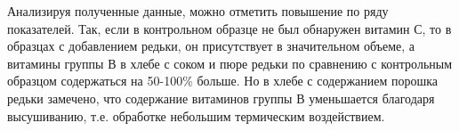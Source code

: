 
Анализируя полученные данные, можно отметить повышение по ряду
показателей. Так, если в контрольном образце не был обнаружен витамин С,
то в образцах с добавлением редьки, он присутствует в значительном
объеме, а витамины группы В в хлебе с соком и пюре редьки по сравнению с
контрольным образцом содержаться на 50-100\% больше. Но в хлебе с
содержанием порошка редьки замечено, что содержание витаминов группы В
уменьшается благодаря высушиванию, т.е. обработке небольшим термическим
воздействием.

